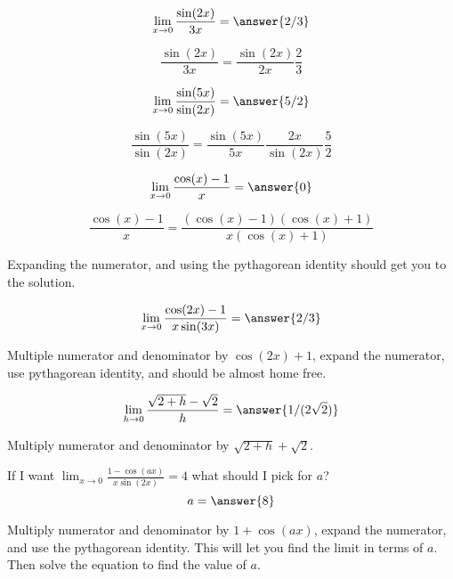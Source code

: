 \documentclass[handout]{ximera}
\begin{document}
\begin{exercise}
\[\lim_{x \to 0} \frac{\sin(2x)}{3x} = \answer{2/3}\]
\begin{hint}
	\[\frac{\sin(2x)}{3x} = \frac{\sin(2x)}{2x} \frac{2}{3}\]
\end{hint}
\end{exercise}

\begin{exercise}
\[\lim_{x \to 0} \frac{\sin(5x)}{\sin(2x)} = \answer{5/2}\]
\begin{hint}
	\[ \frac{\sin(5x)}{\sin(2x)} = \frac{\sin(5x)}{5x} \frac{2x}{\sin(2x)} \frac{5}{2}\]
\end{hint}
\end{exercise}

\begin{exercise}
\[\lim_{x \to 0} \frac{\cos(x)-1}{x} = \answer{0}\]
\begin{hint}
	\[\frac{\cos(x)-1}{x} = \frac{(\cos(x)-1)(\cos(x)+1)}{x(\cos(x)+1)}\]
\end{hint}
\begin{hint}
	Expanding the numerator, and using the pythagorean identity should get you to the solution.
\end{hint}
\end{exercise}

\begin{exercise}
\[\lim_{x \to 0} \frac{\cos(2x)-1}{x\sin(3x)} = \answer{2/3}\]
\begin{hint}
	Multiple numerator and denominator by $\cos(2x)+1$, expand the numerator, use pythagorean identity, and should be almost home free.
\end{hint}
\end{exercise}

\begin{exercise}
	\[\lim_{h \to 0} \frac{\sqrt{2+h} - \sqrt{2}}{h} = \answer{1/(2\sqrt{2})}\]
	\begin{hint}
		Multiply numerator and denominator by $\sqrt{2+h}+\sqrt{2}$.
	\end{hint}
\end{exercise}

\begin{exercise}
If I want $\lim_{x \to 0} \frac{1-\cos(ax)}{x\sin(2x)} = 4$ what should I pick for $a$?
	\[a = \answer{8}\]
	\begin{hint}
		Multiply numerator and denominator by $1+\cos(ax)$, expand the numerator, and use the pythagorean identity.  This will let you find the limit in terms of $a$.  Then solve the equation to find the value of $a$.
	\end{hint}
\end{exercise}
\end{document}
